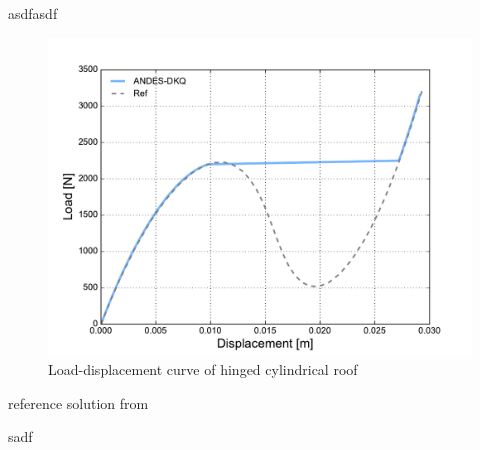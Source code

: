 asdfasdf

\begin{figure}[H]
	\centering
	\def\svgwidth{\columnwidth}
	\includegraphics[width=12cm]{images/Load_displacement_curve_hinged_cylindrical_roof.pdf}
	\caption{Load-displacement curve of hinged cylindrical roof}
	\label{benchmark_hinged_cylindrical_roof}
\end{figure}

reference solution from \cite{Sze2004}

sadf